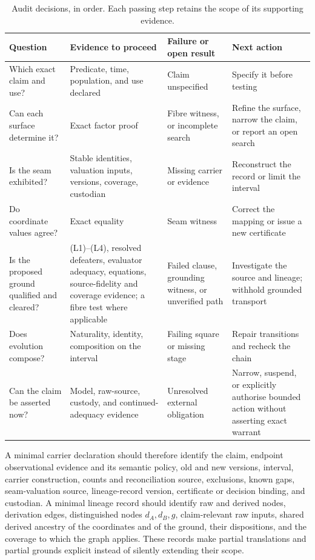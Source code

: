 \documentclass[twocolumn,envcountsect,envcountsame,natbib]{svjour3}
\begin{document}
\begin{table}[htbp]
\centering\footnotesize
\caption{Audit decisions, in order. Each passing step retains the scope of its supporting evidence.}
\label{ex:tab:audit-decisions}
\begin{tabularx}{\textwidth}{@{}p{2.5cm}LLL@{}}
\toprule
Question & Evidence to proceed & Failure or open result & Next action \\
\midrule
Which exact claim and use? & Predicate, time, population, and use declared & Claim unspecified & Specify it before testing \\
Can each surface determine it? & Exact factor proof & Fibre witness, or incomplete search & Refine the surface, narrow the claim, or report an open search \\
Is the seam exhibited? & Stable identities, valuation inputs, versions, coverage, custodian & Missing carrier or evidence & Reconstruct the record or limit the interval \\
Do coordinate values agree? & Exact equality & Seam witness & Correct the mapping or issue a new certificate \\
Is the proposed ground qualified and cleared? & (L1)--(L4), resolved defeaters, evaluator adequacy, equations, source-fidelity and coverage evidence; a fibre test where applicable & Failed clause, grounding witness, or unverified path & Investigate the source and lineage; withhold grounded transport \\
Does evolution compose? & Naturality, identity, composition on the interval & Failing square or missing stage & Repair transitions and recheck the chain \\
Can the claim be asserted now? & Model, raw-source, custody, and continued-adequacy evidence & Unresolved external obligation & Narrow, suspend, or explicitly authorise bounded action without asserting exact warrant \\
\bottomrule
\end{tabularx}
\end{table}

A minimal carrier declaration should therefore identify the claim, endpoint observational evidence and its semantic policy, old and new versions, interval, carrier construction, counts and reconciliation source, exclusions, known gaps, seam-valuation source, lineage-record version, certificate or decision binding, and custodian. A minimal lineage record should identify raw and derived nodes, derivation edges, distinguished nodes $d_A,d_B,g$, claim-relevant raw inputs, shared derived ancestry of the coordinates and of the ground, their dispositions, and the coverage to which the graph applies. These records make partial translations and partial grounds explicit instead of silently extending their scope.
\end{document}
